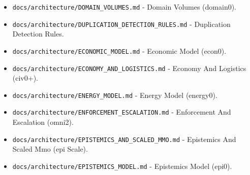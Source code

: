 \documentclass[9pt,a4paper,openany]{book}
\begin{document}
\begin{itemize}
\item \texttt{docs/\allowbreak{}architecture/\allowbreak{}DOMAIN\_\allowbreak{}VOLUMES.\allowbreak{}md} -\allowbreak{} Domain Volumes (domain0).\allowbreak{}
\end{itemize}

\begin{itemize}
\item \texttt{docs/\allowbreak{}architecture/\allowbreak{}DUPLICATION\_\allowbreak{}DETECTION\_\allowbreak{}RULES.\allowbreak{}md} -\allowbreak{} Duplication Detection Rules.\allowbreak{}
\end{itemize}

\begin{itemize}
\item \texttt{docs/\allowbreak{}architecture/\allowbreak{}ECONOMIC\_\allowbreak{}MODEL.\allowbreak{}md} -\allowbreak{} Economic Model (econ0).\allowbreak{}
\end{itemize}

\begin{itemize}
\item \texttt{docs/\allowbreak{}architecture/\allowbreak{}ECONOMY\_\allowbreak{}AND\_\allowbreak{}LOGISTICS.\allowbreak{}md} -\allowbreak{} Economy And Logistics (civ0+).\allowbreak{}
\end{itemize}

\begin{itemize}
\item \texttt{docs/\allowbreak{}architecture/\allowbreak{}ENERGY\_\allowbreak{}MODEL.\allowbreak{}md} -\allowbreak{} Energy Model (energy0).\allowbreak{}
\end{itemize}

\begin{itemize}
\item \texttt{docs/\allowbreak{}architecture/\allowbreak{}ENFORCEMENT\_\allowbreak{}ESCALATION.\allowbreak{}md} -\allowbreak{} Enforcement And Escalation (omni2).\allowbreak{}
\end{itemize}

\begin{itemize}
\item \texttt{docs/\allowbreak{}architecture/\allowbreak{}EPISTEMICS\_\allowbreak{}AND\_\allowbreak{}SCALED\_\allowbreak{}MMO.\allowbreak{}md} -\allowbreak{} Epistemics And Scaled Mmo (epi Scale).\allowbreak{}
\end{itemize}

\begin{itemize}
\item \texttt{docs/\allowbreak{}architecture/\allowbreak{}EPISTEMICS\_\allowbreak{}MODEL.\allowbreak{}md} -\allowbreak{} Epistemics Model (epi0).\allowbreak{}
\end{itemize}
\end{document}
